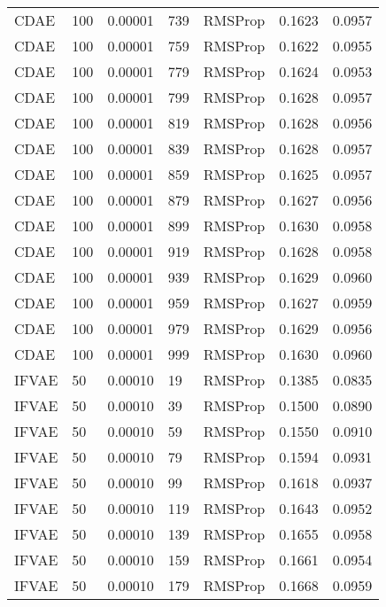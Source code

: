 \begin{tabular}{llrllrr}
    CDAE &  100 &  0.00001 &   739 &   RMSProp &  0.1623 &       0.0957 \\
    CDAE &  100 &  0.00001 &   759 &   RMSProp &  0.1622 &       0.0955 \\
    CDAE &  100 &  0.00001 &   779 &   RMSProp &  0.1624 &       0.0953 \\
    CDAE &  100 &  0.00001 &   799 &   RMSProp &  0.1628 &       0.0957 \\
    CDAE &  100 &  0.00001 &   819 &   RMSProp &  0.1628 &       0.0956 \\
    CDAE &  100 &  0.00001 &   839 &   RMSProp &  0.1628 &       0.0957 \\
    CDAE &  100 &  0.00001 &   859 &   RMSProp &  0.1625 &       0.0957 \\
    CDAE &  100 &  0.00001 &   879 &   RMSProp &  0.1627 &       0.0956 \\
    CDAE &  100 &  0.00001 &   899 &   RMSProp &  0.1630 &       0.0958 \\
    CDAE &  100 &  0.00001 &   919 &   RMSProp &  0.1628 &       0.0958 \\
    CDAE &  100 &  0.00001 &   939 &   RMSProp &  0.1629 &       0.0960 \\
    CDAE &  100 &  0.00001 &   959 &   RMSProp &  0.1627 &       0.0959 \\
    CDAE &  100 &  0.00001 &   979 &   RMSProp &  0.1629 &       0.0956 \\
    CDAE &  100 &  0.00001 &   999 &   RMSProp &  0.1630 &       0.0960 \\
   IFVAE &   50 &  0.00010 &    19 &   RMSProp &  0.1385 &       0.0835 \\
   IFVAE &   50 &  0.00010 &    39 &   RMSProp &  0.1500 &       0.0890 \\
   IFVAE &   50 &  0.00010 &    59 &   RMSProp &  0.1550 &       0.0910 \\
   IFVAE &   50 &  0.00010 &    79 &   RMSProp &  0.1594 &       0.0931 \\
   IFVAE &   50 &  0.00010 &    99 &   RMSProp &  0.1618 &       0.0937 \\
   IFVAE &   50 &  0.00010 &   119 &   RMSProp &  0.1643 &       0.0952 \\
   IFVAE &   50 &  0.00010 &   139 &   RMSProp &  0.1655 &       0.0958 \\
   IFVAE &   50 &  0.00010 &   159 &   RMSProp &  0.1661 &       0.0954 \\
   IFVAE &   50 &  0.00010 &   179 &   RMSProp &  0.1668 &       0.0959 \\

\end{tabular}
